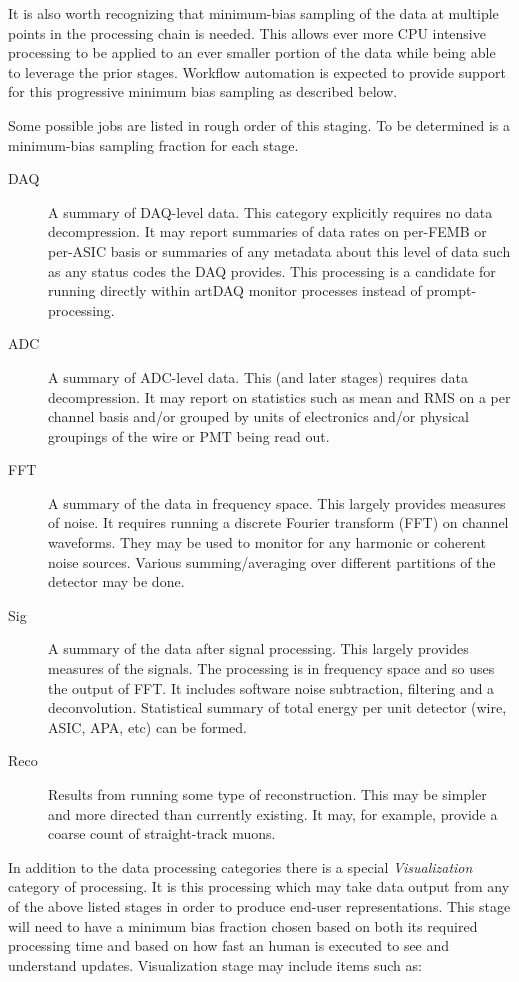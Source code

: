 \documentclass[pdftex,12pt,letter]{article}
\begin{document}
It is also worth recognizing that minimum-bias sampling of the data at
multiple points in the processing chain is needed.  This allows ever
more CPU intensive processing to be applied to an ever smaller portion
of the data while being able to leverage the prior stages.  Workflow
automation is expected to provide support for this progressive minimum
bias sampling as described below.

Some possible jobs are listed in rough order of this staging.  To be
determined is a minimum-bias sampling fraction for each stage.

\begin{description}
\item[DAQ] A summary of DAQ-level data.  This category explicitly
  requires no data decompression.  It may report summaries of data
  rates on per-FEMB or per-ASIC basis or summaries of any metadata
  about this level of data such as any status codes the DAQ provides.
  This processing is a candidate for running directly within artDAQ
  monitor processes instead of prompt-processing.
\item[ADC] A summary of ADC-level data.  This (and later stages)
  requires data decompression.  It may report on statistics such as
  mean and RMS on a per channel basis and/or grouped by units of
  electronics and/or physical groupings of the wire or PMT being read
  out.
\item[FFT] A summary of the data in frequency space.  This largely
  provides measures of noise.  It requires running a discrete Fourier
  transform (FFT) on channel waveforms.  They may be used to monitor
  for any harmonic or coherent noise sources.  Various
  summing/averaging over different partitions of the detector may be
  done.
\item[Sig] A summary of the data after signal processing.  This
  largely provides measures of the signals.  The processing is in
  frequency space and so uses the output of FFT.  It includes software
  noise subtraction, filtering and a deconvolution.  Statistical
  summary of total energy per unit detector (wire, ASIC, APA, etc) can
  be formed.
\item[Reco] Results from running some type of reconstruction. This may
  be simpler and more directed than currently existing.  It may, for
  example, provide a coarse count of straight-track muons.
\end{description}

In addition to the data processing categories there is a special
\textit{Visualization} category of processing.  It is this processing
which may take data output from any of the above listed stages in
order to produce end-user representations.  This stage will need to
have a minimum bias fraction chosen based on both its required
processing time and based on how fast an human is executed to see and
understand updates.  Visualization stage may include items such as:
\end{document}
